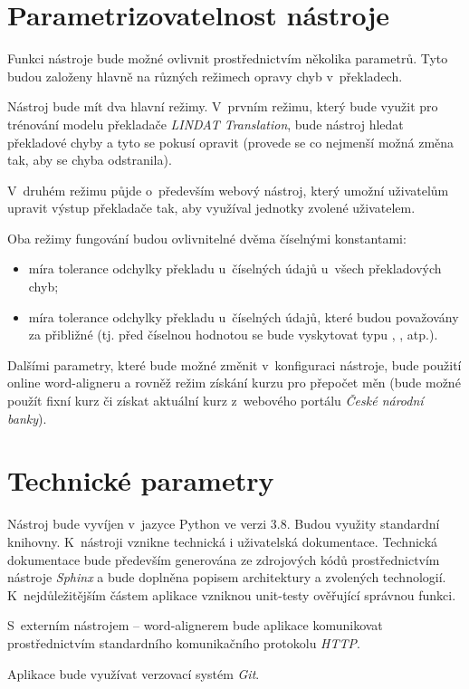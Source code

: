 \documentclass[12pt,a4paper]{article}
\begin{document}
	\section{Parametrizovatelnost nástroje}
	Funkci nástroje bude možné ovlivnit prostřednictvím několika parametrů. Tyto budou založeny hlavně na různých režimech opravy chyb v~překladech. 
	
	Nástroj bude mít dva hlavní režimy. V~prvním režimu, který bude využit pro trénování modelu překladače \textit{LINDAT Translation}, bude nástroj hledat překladové chyby a tyto se pokusí opravit (provede se co nejmenší možná změna tak, aby se chyba odstranila).
	
	V~druhém režimu půjde o~především webový nástroj, který umožní uživatelům upravit výstup překladače tak, aby využíval jednotky zvolené uživatelem.
	
	Oba režimy fungování budou ovlivnitelné dvěma číselnými konstantami:
	
	\begin{itemize}
		\item míra tolerance odchylky překladu u~číselných údajů u~všech překladových chyb;
		\item míra tolerance odchylky překladu u~číselných údajů, které budou považovány za přibližné (tj. před číselnou hodnotou se bude vyskytovat typu , , atp.).
	\end{itemize} 
	
	Dalšími parametry, které bude možné změnit v~konfiguraci nástroje, bude použití online word-aligneru a rovněž režim získání kurzu pro přepočet měn (bude možné použít fixní kurz či získat aktuální kurz z~webového portálu \textit{České národní banky}).
	
	\section{Technické parametry}
	Nástroj bude vyvíjen v~jazyce Python ve verzi 3.8. Budou využity standardní knihovny. K~nástroji vznikne technická i uživatelská dokumentace. Technická dokumentace bude především generována ze zdrojových kódů prostřednictvím nástroje \textit{Sphinx} a bude doplněna popisem architektury a zvolených technologií. K~nejdůležitějším částem aplikace vzniknou unit-testy ověřující správnou funkci.
	
	S~externím nástrojem -- word-alignerem bude aplikace komunikovat prostřednictvím standardního komunikačního protokolu \textit{HTTP}.
	
	Aplikace bude využívat verzovací systém \textit{Git}.
\end{document}

